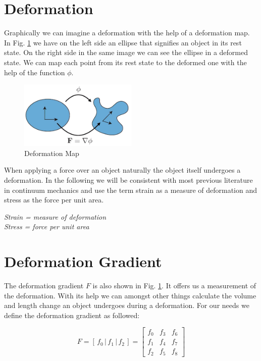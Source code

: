 \section{Deformation}
Graphically we can imagine a deformation with the help of a deformation map. In Fig. \ref{fig:deformationmap} we have on the left side an ellipse that signifies an object in its rest state. On the right side in the same image we can see the ellipse in a deformed state. We can map each point from its rest state to the deformed one with the help of the function $\phi$.

\begin{figure}[!htbp]
	\centering
	\includegraphics[width=0.5\textwidth]{resources/deformation_map}
	\caption{Deformation Map {\cite{STREAM2018}}}
	\label{fig:deformationmap}
\end{figure}

When applying a force over an object naturally the object itself undergoes a deformation. In the following we will be consistent with most previous literature in continuum mechanics and use the term strain as a measure of deformation and stress as the force per unit area.

\begin{addmargin}[2cm]{2cm}
\textit{Strain = measure of deformation}  \\
\textit{Stress = force per unit area} 
\end{addmargin}


\section{Deformation Gradient}

The deformation gradient $F$ is also shown in Fig. \ref{fig:deformationmap}. It offers us a measurement of the deformation. With its help we can amongst other things calculate the volume and length change an object undergoes during a deformation.
For our needs we define the deformation gradient as followed:

\[
F = \left[ \,f_0\, \bigg| \,f_1\, \bigg| \,f_2\, \right] = \begin{bmatrix} f_0 & f_3 & f_6 \\ f_1 & f_4 & f_7 \\ f_2 & f_5 & f_8 \end{bmatrix}
\]


